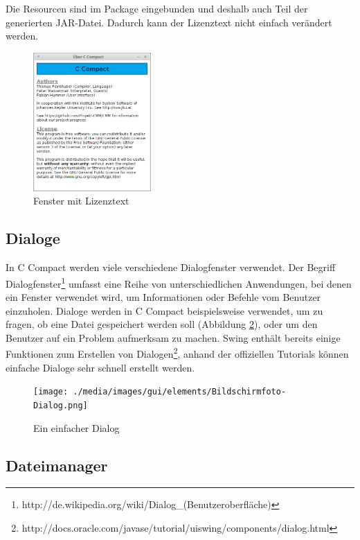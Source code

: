 Die Resourcen sind im Package eingebunden und deshalb auch Teil der generierten JAR-Datei. Dadurch kann der Lizenztext nicht einfach verändert werden.

\begin{figure}[htp]
\centering
\includegraphics[width=0.4\textwidth]{./media/images/gui/elements/Bildschirmfoto-About.png}
\caption{Fenster mit Lizenztext}
\label{fig:win-about}
\end{figure}





\subsection{Dialoge}
\label{sec:win-dialog}
In C Compact werden viele verschiedene Dialogfenster verwendet. Der Begriff Dialogfenster\footnote{http://de.wikipedia.org/wiki/Dialog\_(Benutzeroberfläche)} umfasst eine Reihe von unterschiedlichen Anwendungen, bei denen ein Fenster verwendet wird, um Informationen oder Befehle vom Benutzer einzuholen. Dialoge werden in C Compact beispielsweise verwendet, um zu fragen, ob eine Datei gespeichert werden soll (Abbildung \ref{fig:win-dialog}), oder um den Benutzer auf ein Problem aufmerksam zu machen. Swing enthält bereits einige Funktionen zum Erstellen von Dialogen\footnote{http://docs.oracle.com/javase/tutorial/uiswing/components/dialog.html}, anhand der offiziellen Tutorials können einfache Dialoge sehr schnell erstellt werden.

\begin{figure}[htp]
\centering
\texttt{[image: ./media/images/gui/elements/Bildschirmfoto-Dialog.png]}
\caption{Ein einfacher Dialog}
\label{fig:win-dialog}
\end{figure}

\subsection{Dateimanager}


